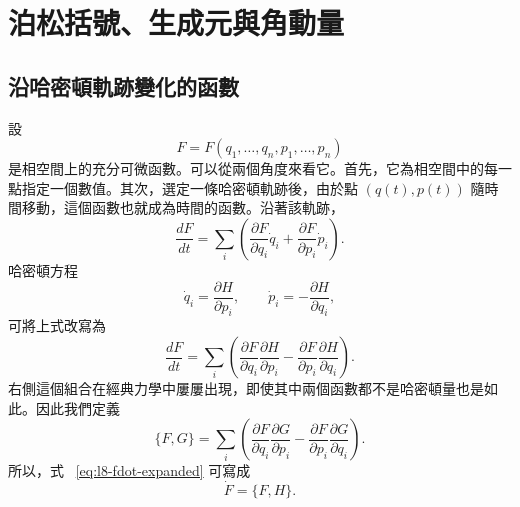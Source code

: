 \chapter{泊松括號、生成元與角動量}


\section{沿哈密頓軌跡變化的函數}

設
\[
  F=F(q_1,\ldots,q_n,p_1,\ldots,p_n)
\]
是相空間上的充分可微函數。可以從兩個角度來看它。首先，它為相空間中的每一點指定一個數值。其次，選定一條哈密頓軌跡後，由於點 \((q(t),p(t))\) 隨時間移動，這個函數也就成為時間的函數。沿著該軌跡，
\begin{equation}
  \frac{dF}{dt}
  =
  \sum_i\left(
    \frac{\partial F}{\partial q_i}\dot q_i
    +\frac{\partial F}{\partial p_i}\dot p_i
  \right).
  \label{eq:l8-chain-rule}
\end{equation}
哈密頓方程
\begin{equation}
  \dot q_i=\frac{\partial H}{\partial p_i},
  \qquad
  \dot p_i=-\frac{\partial H}{\partial q_i},
  \label{eq:l8-hamilton-equations}
\end{equation}
可將上式改寫為
\begin{equation}
  \frac{dF}{dt}
  =
  \sum_i\left(
    \frac{\partial F}{\partial q_i}
    \frac{\partial H}{\partial p_i}
    -
    \frac{\partial F}{\partial p_i}
    \frac{\partial H}{\partial q_i}
  \right).
  \label{eq:l8-fdot-expanded}
\end{equation}
右側這個組合在經典力學中屢屢出現，即使其中兩個函數都不是哈密頓量也是如此。因此我們定義
\begin{equation}
  \boxed{
  \{F,G\}
  =
  \sum_i\left(
    \frac{\partial F}{\partial q_i}
    \frac{\partial G}{\partial p_i}
    -
    \frac{\partial F}{\partial p_i}
    \frac{\partial G}{\partial q_i}
  \right).}
  \label{eq:l8-poisson-definition}
\end{equation}
所以，式 ~\eqref{eq:l8-fdot-expanded} 可寫成
\begin{equation}
  \boxed{\dot F=\{F,H\}.}
  \label{eq:l8-time-generator}
\end{equation}

